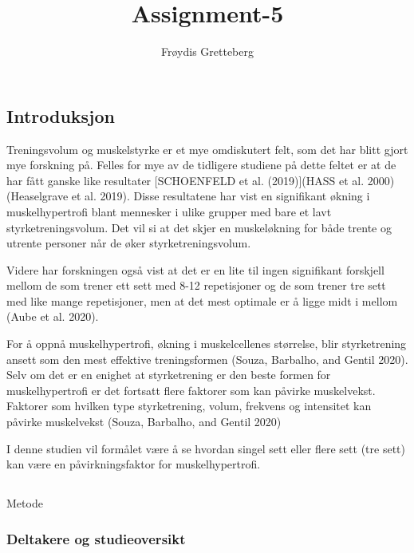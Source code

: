 \documentclass[
  letterpaper,
  DIV=11,
  numbers=noendperiod]{scrartcl}
\title{Assignment-5}
\author{Frøydis Gretteberg}
\date{}
\begin{document}
\maketitle
\ifdefined\Shaded\renewenvironment{Shaded}{\begin{tcolorbox}[interior hidden, borderline west={3pt}{0pt}{shadecolor}, enhanced, boxrule=0pt, breakable, sharp corners, frame hidden]}{\end{tcolorbox}}\fi

\hypertarget{introduksjon}{%
\subsection{Introduksjon}\label{introduksjon}}

Treningsvolum og muskelstyrke er et mye omdiskutert felt, som det har
blitt gjort mye forskning på. Felles for mye av de tidligere studiene på
dette feltet er at de har fått ganske like resultater {[}SCHOENFELD et
al. (2019){]}(HASS et al. 2000)(Heaselgrave et al. 2019). Disse
resultatene har vist en signifikant økning i muskelhypertrofi blant
mennesker i ulike grupper med bare et lavt styrketreningsvolum. Det vil
si at det skjer en muskeløkning for både trente og utrente personer når
de øker styrketreningsvolum.

Videre har forskningen også vist at det er en lite til ingen signifikant
forskjell mellom de som trener ett sett med 8-12 repetisjoner og de som
trener tre sett med like mange repetisjoner, men at det mest optimale er
å ligge midt i mellom (Aube et al. 2020).

For å oppnå muskelhypertrofi, økning i muskelcellenes størrelse, blir
styrketrening ansett som den mest effektive treningsformen (Souza,
Barbalho, and Gentil 2020). Selv om det er en enighet at styrketrening
er den beste formen for muskelhypertrofi er det fortsatt flere faktorer
som kan påvirke muskelvekst. Faktorer som hvilken type styrketrening,
volum, frekvens og intensitet kan påvirke muskelvekst (Souza, Barbalho,
and Gentil 2020)

I denne studien vil formålet være å se hvordan singel sett eller flere
sett (tre sett) kan være en påvirkningsfaktor for muskelhypertrofi.

\hypertarget{section}{%
\subsection{}\label{section}}

Metode

\hypertarget{deltakere-og-studieoversikt}{%
\subsubsection{Deltakere og
studieoversikt}\label{deltakere-og-studieoversikt}}
\end{document}
